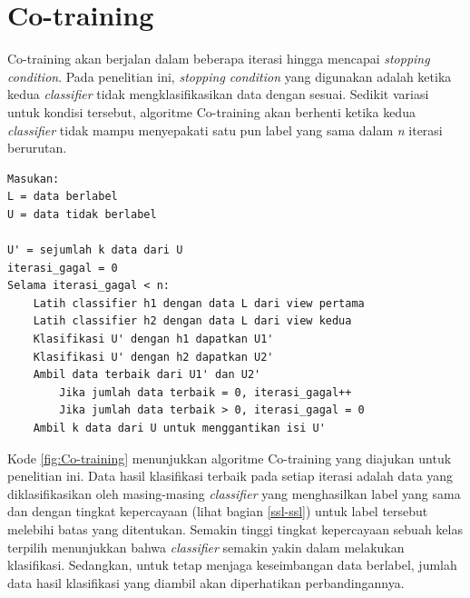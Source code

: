 \section{Co-training} \label{sec:cotrain}
Co-training akan berjalan dalam beberapa iterasi hingga mencapai \textit{stopping condition}. Pada penelitian ini, \textit{stopping condition} yang digunakan adalah ketika kedua \textit{classifier} tidak mengklasifikasikan data dengan sesuai. Sedikit variasi untuk kondisi tersebut, algoritme Co-training akan berhenti ketika kedua \textit{classifier} tidak mampu menyepakati satu pun label yang sama dalam \textit{n} iterasi berurutan.
\begin{lstlisting}[caption={Algoritme Co-training yang akan digunakan}, label={fig:Co-training}]
Masukan:
L = data berlabel 
U = data tidak berlabel

U' = sejumlah k data dari U
iterasi_gagal = 0
Selama iterasi_gagal < n:
	Latih classifier h1 dengan data L dari view pertama
	Latih classifier h2 dengan data L dari view kedua
	Klasifikasi U' dengan h1 dapatkan U1'
	Klasifikasi U' dengan h2 dapatkan U2' 
	Ambil data terbaik dari U1' dan U2' 
		Jika jumlah data terbaik = 0, iterasi_gagal++
		Jika jumlah data terbaik > 0, iterasi_gagal = 0
	Ambil k data dari U untuk menggantikan isi U'

\end{lstlisting}
Kode \ref{fig:Co-training} menunjukkan algoritme Co-training yang diajukan untuk penelitian ini. 
Data hasil klasifikasi terbaik pada setiap iterasi adalah data yang diklasifikasikan oleh masing-masing \textit{classifier} yang menghasilkan label yang sama dan dengan tingkat kepercayaan (lihat bagian \ref{ssl-ssl}) untuk label tersebut melebihi batas yang ditentukan. Semakin tinggi tingkat kepercayaan sebuah kelas terpilih menunjukkan bahwa \textit{classifier} semakin yakin dalam melakukan klasifikasi. Sedangkan, untuk tetap menjaga keseimbangan data berlabel, jumlah data hasil klasifikasi yang diambil akan diperhatikan perbandingannya. 

